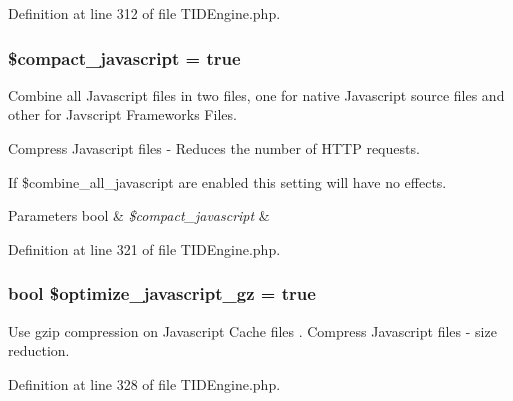 Definition at line 312 of file TIDEngine.php.

\hypertarget{group__js__cache__settings_ga8090fbc1c574d4134d6ab4b973d170d0}{
\subsubsection[{\$compact\_\-javascript}]{\setlength{\rightskip}{0pt plus 5cm}\$compact\_\-javascript = true}}
\label{group__js__cache__settings_ga8090fbc1c574d4134d6ab4b973d170d0}
Combine all Javascript files in two files, one for native Javascript source files and other for Javscript Frameworks Files.\par
 Compress Javascript files -\/ Reduces the number of HTTP requests.\par
\par
 If \$combine\_\-all\_\-javascript are enabled this setting will have no effects.


\begin{DoxyParams}[1]{Parameters}
bool & {\em \$compact\_\-javascript} & \\
\hline
\end{DoxyParams}


Definition at line 321 of file TIDEngine.php.

\hypertarget{group__js__cache__settings_ga0cdc0ded508ad7f1a3cfc63ef1df780a}{
\subsubsection[{\$optimize\_\-javascript\_\-gz}]{\setlength{\rightskip}{0pt plus 5cm}bool \$optimize\_\-javascript\_\-gz = true}}
\label{group__js__cache__settings_ga0cdc0ded508ad7f1a3cfc63ef1df780a}
Use gzip compression on Javascript Cache files . Compress Javascript files -\/ size reduction. 

Definition at line 328 of file TIDEngine.php.

